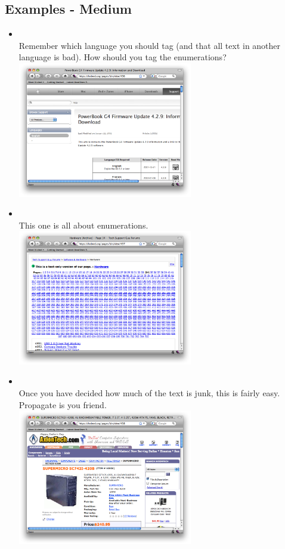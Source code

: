 \documentclass[12pt,a4paper]{article}
\begin{document}
\subsection{Examples - Medium}
\label{ExMedium}
\begin{itemize}
\item {} \\
Remember which language you should tag (and that all text in another language is bad). How should you tag the enumerations? \\
\includegraphics[width=0.6\textwidth]{images/436.png} \\

\item {} \\
This one is all about enumerations. \\
\includegraphics[width=0.6\textwidth]{images/437.png} \\

\item {} \\
Once you have decided how much of the text is junk, this is fairly easy. Propagate is you friend. \\
\includegraphics[width=0.6\textwidth]{images/438.png} \\


\end{itemize}
\end{document}
